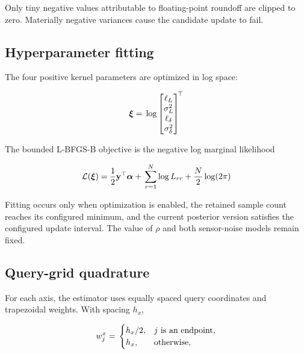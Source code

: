 \documentclass[11pt]{article}
\begin{document}
Only tiny negative values attributable to floating-point roundoff are clipped to zero. Materially negative variances cause the candidate update to fail.


\subsection{Hyperparameter fitting}


The four positive kernel parameters are optimized in log space:


\begin{equation}
\boldsymbol\xi \\
= \\
\log
\begin{bmatrix}
\ell_L \\
\sigma_L^2  \\
\ell_\delta \\
\sigma_\delta^2 \\
\end{bmatrix}^{\!\top}
\end{equation}


The bounded L-BFGS-B objective is the negative log marginal likelihood


\begin{equation}
\mathcal L(\boldsymbol\xi) \\
= \\
\frac{1}{2}\mathbf y^\top\boldsymbol\alpha \\
+ \\
\sum_{r=1}^{N}\log L_{rr} \\
+ \\
\frac{N}{2}\log(2\pi)
\end{equation}


Fitting occurs only when optimization is enabled, the retained sample count reaches its configured minimum, and the current posterior version satisfies the configured update interval. The value of $\rho$ and both sensor-noise models remain fixed.


\subsection{Query-grid quadrature}


For each axis, the estimator uses equally spaced query coordinates and trapezoidal weights. With spacing $h_x$,


\begin{equation}
w^x_j \\
= \\
\begin{cases}
h_x/2, & j\text{ is an endpoint},\\
h_x, & \text{otherwise}, \\
\end{cases}
\end{equation}
\end{document}
